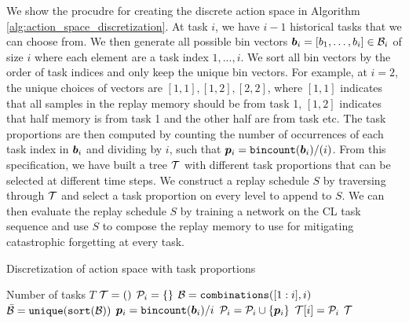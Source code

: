 We show the procudre for creating the discrete action space in Algorithm \ref{alg:action_space_discretization}. At task $i$, we have $i-1$ historical tasks that we can choose from. We then generate all possible bin vectors ${\bm{b}}_i = [b_1, \dots, b_{i}] \in {\mathcal{B}}_i$ of size $i$ where each element are a task index $1, ..., i$. We sort all bin vectors by the order of task indices and only keep the unique bin vectors. For example, at $i=2$, the unique choices of vectors are $[1,1], [1,2], [2,2]$, where $[1,1]$ indicates that all samples in the replay memory should be from task 1, $[1,2]$ indicates that half memory is from task 1 and the other half are from task etc. The task proportions are then computed by counting the number of occurrences of each task index in ${\bm{b}}_i$ and dividing by $i$, such that ${\bm{p}}_i = \texttt{bincount}({\bm{b}}_i) / (i)$. From this specification, we have built a tree ${\mathcal{T}}$ with different task proportions that can be selected at different time steps. We construct a replay schedule $S$ by traversing through ${\mathcal{T}}$ and select a task proportion on every level to append to $S$. We can then evaluate the replay schedule $S$ by training a network on the CL task sequence and use $S$ to compose the replay memory to use for mitigating catastrophic forgetting at every task. 


\begin{algorithm}[t]
	\caption{Discretization of action space with task proportions}
	\label{alg:action_space_discretization}
	\begin{algorithmic}[1]
		\Require Number of tasks $T$
		\State ${\mathcal{T}} = ()$ 
		\State ${\mathcal{P}}_i = \{\}$ 
		\State ${\mathcal{B}} = \texttt{combinations}([1:i], i)$ 
		\State $\bar{{\mathcal{B}}} = \texttt{unique}(\texttt{sort}({\mathcal{B}}))$ 
		\State ${\bm{p}}_i = \texttt{bincount}({\bm{b}}_i) / i$ 
		\State ${\mathcal{P}}_i = {\mathcal{P}}_i \cup \{ {\bm{p}}_i \}$ 
		\EndFor
		\State ${\mathcal{T}}[i] = {\mathcal{P}}_i$ 
		\EndFor
		\State \Return ${\mathcal{T}}$ 
	\end{algorithmic}
\end{algorithm}



